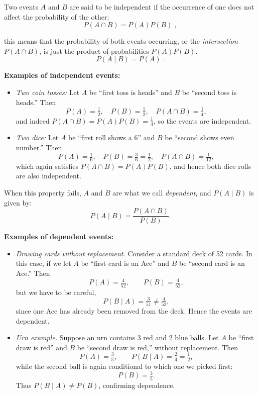\medskip

Two events $A$ and $B$ are said to be independent if the occurrence of one does not affect the probability of the other:
\begin{equation}
    P(A \cap B) = P(A)P(B) \; ,
\end{equation}

this means that the probability of both events occurring, or the \textit{intersection} \(P(A \cap B)\), is just the product of probabilities \(P(A)P(B)\). 
\begin{equation}
    P(A \mid B) = P(A) \; .
\end{equation}

\textbf{Examples of independent events:}

\begin{itemize}
    \item \textit{Two coin tosses:} Let $A$ be “first toss is heads” and $B$ be “second toss is heads.” Then
    \[
        P(A)=\tfrac{1}{2}, \quad P(B)=\tfrac{1}{2}, \quad P(A\cap B)=\tfrac{1}{4},
    \]
    and indeed $P(A\cap B)=P(A)P(B)=\tfrac{1}{4}$, so the events are independent.

    \item \textit{Two dice:} Let $A$ be “first roll shows a 6” and $B$ be “second shows even number.” Then
    \[
        P(A)=\tfrac{1}{6}, \quad P(B)=\tfrac{3}{6}=\tfrac{1}{2}, \quad P(A\cap B)=\tfrac{1}{12},
    \]
    which again satisfies $P(A\cap B)=P(A)P(B)$, and hence both dice rolls are also independent.
\end{itemize}

When this property fails, $A$ and $B$ are what we call \textit{dependent}, and $P(A \mid B)$ is given by:
\begin{equation}
    P(A \mid B)=\frac{P(A\cap B)}{P(B)}.
\end{equation}

\textbf{Examples of dependent events:}

\begin{itemize}
    \item \textit{Drawing cards without replacement.} Consider a standard deck of 52 cards. In this case, if we let $A$ be “first card is an Ace” and $B$ be “second card is an Ace.” Then
    \[
        P(A)=\tfrac{4}{52}, \qquad P(B)=\tfrac{4}{52},
    \]
    but we have to be careful,
    \[
        P(B \mid A)=\tfrac{3}{51} \neq \tfrac{4}{52},
    \]
    since one Ace has already been removed from the deck. Hence the events are dependent.

    \item \textit{Urn example.} Suppose an urn contains 3 red and 2 blue balls. Let $A$ be “first draw is red” and $B$ be “second draw is red,” without replacement. Then
    \[
        P(A)=\tfrac{3}{5}, \qquad P(B \mid A)=\tfrac{2}{4}=\tfrac{1}{2},
    \]
    while the second ball is again conditional to which one we picked first:
    \[
        P(B)=\tfrac{3}{5}.
    \]
    Thus $P(B \mid A) \neq P(B)$, confirming dependence.
\end{itemize}

